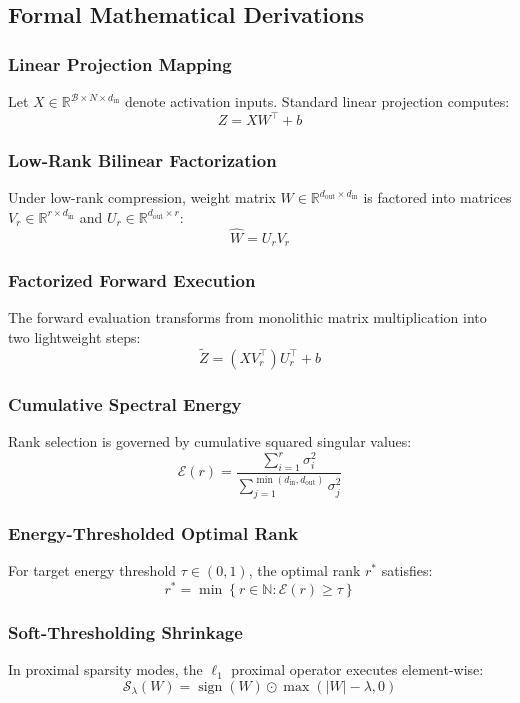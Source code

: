 \subsection{Formal Mathematical Derivations}

\subsubsection{Linear Projection Mapping}
Let $X \in \mathbb{R}^{\mathcal{B} \times N \times d_{\text{in}}}$ denote activation inputs. Standard linear projection computes:
\[
Z = X W^\top + b
\]

\subsubsection{Low-Rank Bilinear Factorization}
Under low-rank compression, weight matrix $W \in \mathbb{R}^{d_{\text{out}} \times d_{\text{in}}}$ is factored into matrices $V_r \in \mathbb{R}^{r \times d_{\text{in}}}$ and $U_r \in \mathbb{R}^{d_{\text{out}} \times r}$:
\[
\hat{W} = U_r V_r
\]

\subsubsection{Factorized Forward Execution}
The forward evaluation transforms from monolithic matrix multiplication into two lightweight steps:
\[
\tilde{Z} = (X V_r^\top) U_r^\top + b
\]

\subsubsection{Cumulative Spectral Energy}
Rank selection is governed by cumulative squared singular values:
\[
\mathcal{E}(r) = \frac{\sum_{i=1}^{r} \sigma_i^2}{\sum_{j=1}^{\min(d_{\text{in}}, d_{\text{out}})} \sigma_j^2}
\]

\subsubsection{Energy-Thresholded Optimal Rank}
For target energy threshold $\tau \in (0, 1)$, the optimal rank $r^*$ satisfies:
\[
r^* = \min \left\{ r \in \mathbb{N} : \mathcal{E}(r) \ge \tau \right\}
\]

\subsubsection{Soft-Thresholding Shrinkage}
In proximal sparsity modes, the $\ell_1$ proximal operator executes element-wise:
\[
\mathcal{S}_\lambda(W) = \operatorname{sign}(W) \odot \max(|W| - \lambda, 0)
\]

